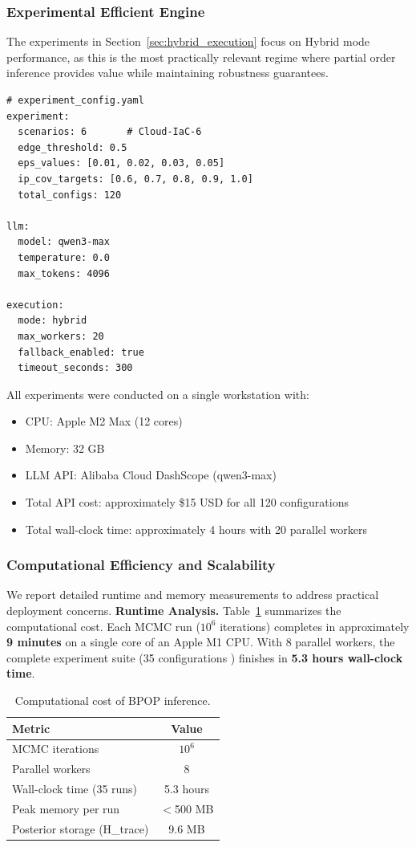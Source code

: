 \documentclass{article}
\theoremstyle{plain}
\theoremstyle{definition}
\theoremstyle{remark}
\begin{document}
\subsubsection{Experimental Efficient Engine}
The experiments in Section~\ref{sec:hybrid_execution} focus on Hybrid mode performance, 
as this is the most practically relevant regime where partial order inference provides 
value while maintaining robustness guarantees.
\label{app:experiment_config}

\begin{lstlisting}[basicstyle=\small\ttfamily,frame=single]
# experiment_config.yaml
experiment:
  scenarios: 6       # Cloud-IaC-6
  edge_threshold: 0.5
  eps_values: [0.01, 0.02, 0.03, 0.05]
  ip_cov_targets: [0.6, 0.7, 0.8, 0.9, 1.0]
  total_configs: 120

llm:
  model: qwen3-max
  temperature: 0.0
  max_tokens: 4096

execution:
  mode: hybrid
  max_workers: 20
  fallback_enabled: true
  timeout_seconds: 300
\end{lstlisting}


All experiments were conducted on a single workstation with:
\begin{itemize}
\item CPU: Apple M2 Max (12 cores)
\item Memory: 32 GB
\item LLM API: Alibaba Cloud DashScope (qwen3-max)
\item Total API cost: approximately \$15 USD for all 120 configurations
\item Total wall-clock time: approximately 4 hours with 20 parallel workers
\end{itemize}




\subsubsection{Computational Efficiency and Scalability}
\label{sec:scalability}
We report detailed runtime and memory measurements to address practical deployment concerns.
\noindent \textbf{Runtime Analysis.}
Table~\ref{tab:runtime} summarizes the computational cost. Each MCMC run ($10^6$ iterations) completes in approximately \textbf{9 minutes} on a single core of an Apple M1 CPU. With 8 parallel workers, the complete experiment suite (35 configurations ) finishes in \textbf{5.3 hours wall-clock time}.
\begin{table}[htbp]
\caption{Computational cost of BPOP inference.}
\label{tab:runtime}
\centering
\small
\begin{tabular}{lc}
\toprule
\textbf{Metric} & \textbf{Value} \\
\midrule
MCMC iterations & $10^6$ \\
Parallel workers & 8 \\
Wall-clock time (35 runs) & 5.3 hours \\
Peak memory per run & $<$500 MB \\
Posterior storage (H\_trace) & 9.6 MB \\
\bottomrule
\end{tabular}
\end{table}
\end{document}
